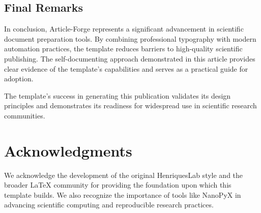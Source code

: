 \subsection{Final Remarks}

In conclusion, Article-Forge represents a significant advancement in scientific document preparation tools. By combining professional typography with modern automation practices, the template reduces barriers to high-quality scientific publishing. The self-documenting approach demonstrated in this article provides clear evidence of the template's capabilities and serves as a practical guide for adoption.

The template's success in generating this publication validates its design principles and demonstrates its readiness for widespread use in scientific research communities.

\section*{Acknowledgments}

We acknowledge the development of the original HenriquesLab style and the broader LaTeX community for providing the foundation upon which this template builds. We also recognize the importance of tools like NanoPyX \cite{nanopyx2024} in advancing scientific computing and reproducible research practices.
